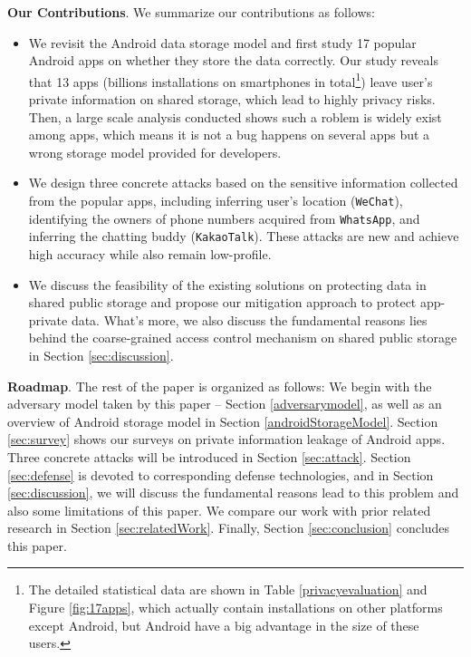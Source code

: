 \documentclass{sig-alternate}
\begin{document}
\textbf{Our Contributions}. We summarize our contributions as follows:
\begin{itemize}

\item We revisit the Android data storage model and first study 17 popular Android apps on whether they store the data correctly. Our study reveals that 13 apps (billions installations on smartphones in total\footnote{The detailed statistical data are shown in Table \ref{privacyevaluation} and Figure \ref{fig:17apps}, which actually contain installations on other platforms except Android, but Android have a big advantage in the size of these users.}) leave user's private information on shared storage, which lead to highly privacy risks. Then, a large scale analysis conducted shows such a roblem is widely exist among apps, which means it is not a bug happens on several apps but a wrong storage model provided for developers.

\item We design three concrete attacks based on the sensitive information collected from the popular apps, including inferring user's location (\texttt{WeChat}), identifying the owners of phone numbers acquired from \texttt{WhatsApp}, and inferring the chatting buddy (\texttt{KakaoTalk}). These attacks are new and achieve high accuracy while also remain low-profile.

\item We discuss the feasibility of the existing solutions on protecting data in shared public storage and propose our mitigation approach to protect app-private data. What's more, we also discuss the fundamental reasons lies behind the coarse-grained access control mechanism on shared public storage in Section \ref{sec:discussion}.
\end{itemize}

\textbf{Roadmap}. The rest of the paper is organized as follows: We begin with the adversary model taken by this paper -- Section \ref{adversarymodel}, as well as an overview of Android storage model in Section \ref{androidStorageModel}. Section \ref{sec:survey} shows our surveys on private information leakage of Android apps. Three concrete attacks will be introduced in Section \ref{sec:attack}. Section \ref{sec:defense} is devoted to corresponding defense technologies, and in Section \ref{sec:discussion}, we will discuss the fundamental reasons lead to this problem and also some limitations of this paper. We compare our work with prior related research in Section \ref{sec:relatedWork}. Finally, Section \ref{sec:conclusion} concludes this paper.
\end{document}
